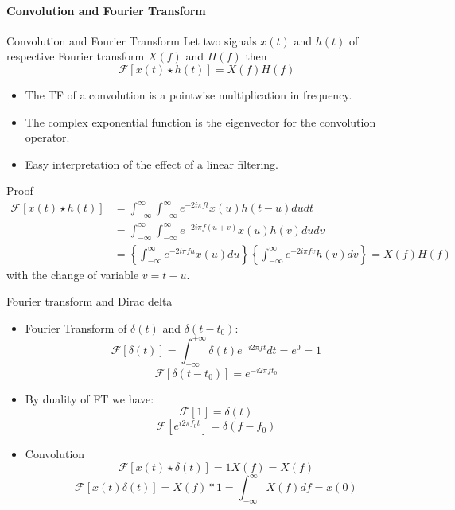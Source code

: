 \paragraph{Convolution and Fourier Transform}
\begin{block}{Convolution and Fourier Transform}
  Let two signals $x(t)$ and $h(t)$ of respective Fourier transform $X(f)$ and
  $H(f)$ then 
  \begin{equation}
    \mathcal{F}
    [ x(t)\star h(t)]  = X(f)H(f)
    \label{eq:tf_conv}
  \end{equation}\vspace{-5mm}
  \begin{itemize}
    \item The TF of a convolution is a pointwise multiplication in frequency.
    \item The complex exponential function is the eigenvector for the convolution operator.
    \item Easy interpretation of the effect of a linear filtering.

  \end{itemize}
\end{block}

\begin{block}{Proof}
  \begin{align*}
    \mathcal{F}
    [ x(t)\star h(t)]&=\int_{-\infty}^\infty \int_{-\infty}^\infty e^{-2i\pi f t} x(u)h(t-u)du dt\\
    &=\int_{-\infty}^\infty \int_{-\infty}^\infty e^{-2i\pi f (u+v)} x(u)h(v)du dv\\
    &= \left\{\int_{-\infty}^\infty  e^{-2i\pi f u} x(u) du\right\}\left\{ \int_{-\infty}^\infty e^{-2i\pi f v} h(v) dv\right\} = X(f)H(f)
  \end{align*}
  with the change of variable $v=t-u$.
\end{block}



\begin{block}{Fourier transform and Dirac delta}
  \begin{itemize}
    \item Fourier Transform of $\delta(t)$ and  $\delta(t-t_0)$:
    $$\mathcal{F}[\delta(t)] = \int_{-\infty}^{+\infty} \delta(t) 
    e^{-i 2\pi f t}dt ={ e^0= 1}$$
    $$\mathcal{F}[\delta(t-t_0)] = 
    e^{-i 2\pi f t_0} $$   
    \item By duality of FT we have:
    $$ \mathcal{F}[1] =  \delta(t) $$
    $$ \mathcal{F}[e^{i 2\pi f_0 t}] = \delta(f-f_0) $$
    \item Convolution
    $$ \mathcal{F}[x(t)\star \delta(t)] = 1X(f)= X(f)$$
    $$ \mathcal{F}[x(t)\delta(t)] = X(f)*1= \int_{-\infty}^\infty X(f)df=x(0)$$
  \end{itemize}
\end{block}


